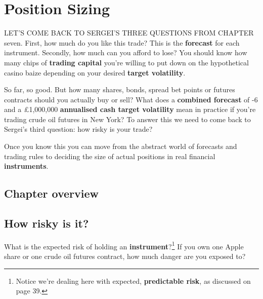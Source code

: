 \chapter{Position Sizing}

LET'S COME BACK TO SERGEI'S THREE QUESTIONS FROM CHAPTER seven. First, how much do you like this trade? This is the \textbf{forecast} for each instrument. Secondly, how much can you afford to lose? You should know how many chips of \textbf{trading capital} you're willing to put down on the hypothetical casino baize depending on your desired \textbf{target volatility}.

So far, so good. But how many shares, bonds, spread bet points or futures contracts should you actually buy or sell? What does a \textbf{combined forecast} of -6 and a £1,000,000 \textbf{annualised cash target volatility} mean in practice if you're trading crude oil futures in New York? To answer this we need to come back to Sergei's third question: how risky is your trade?

Once you know this you can move from the abstract world of forecasts and trading rules to deciding the size of actual positions in real financial \textbf{instruments}.

\section*{Chapter overview}  {}

\begin{chapteroverviewtable}
\end{chapteroverviewtable}

\section*{How risky is it?}  {}

What is the expected risk of holding an \textbf{instrument}?\footnote{Notice we're dealing here with expected, \textbf{predictable risk}, as discussed on page 39.} If you own one Apple share or one crude oil futures contract, how much danger are you exposed to?


